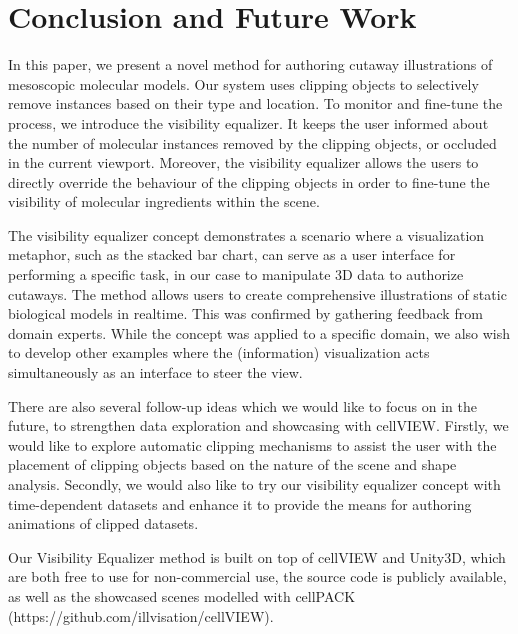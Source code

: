 \section{Conclusion and Future Work}

In this paper, we present a novel method for authoring cutaway illustrations of mesoscopic molecular models.
Our system uses clipping objects to selectively remove instances based on their type and location. 
To monitor and fine-tune the process, we introduce the visibility equalizer. 
It keeps the user informed about the number of molecular instances removed by the clipping objects, or occluded in the current viewport. 
Moreover, the visibility equalizer allows the users to directly override the behaviour of the clipping objects in order to fine-tune the visibility of molecular ingredients within the scene.

The visibility equalizer concept demonstrates a scenario where a visualization metaphor, such as the stacked bar chart, can serve as a user interface for performing a specific task, in our case to manipulate 3D data to authorize cutaways. 
The method allows users to create comprehensive illustrations of static biological models in realtime.
This was confirmed by gathering feedback from domain experts. 
While the concept was applied to a specific domain, we also wish to develop other examples where the (information) visualization acts simultaneously as an interface to steer the view.

There are also several follow-up ideas which we would like to focus on in the future, to strengthen data exploration and showcasing with cellVIEW.
Firstly, we would like to explore automatic clipping mechanisms to assist the user with the placement of clipping objects based on the nature of the scene and shape analysis.
Secondly, we would also like to try our visibility equalizer concept with time-dependent datasets and enhance it to provide the means for authoring animations of clipped datasets.

Our Visibility Equalizer method is built on top of \mbox{cellVIEW} and Unity3D, which are both free to use for non-commercial use, the source code is publicly available, as well as the showcased scenes modelled with cellPACK (https://github.com/illvisation/cellVIEW).



